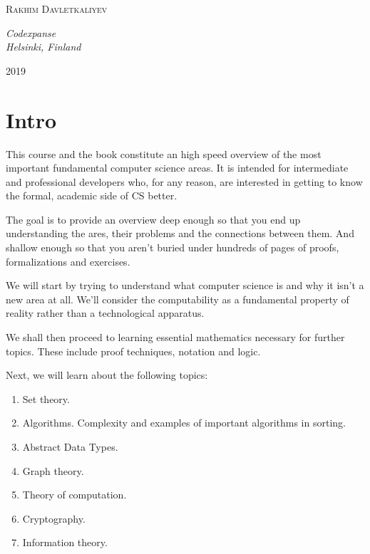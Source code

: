 \documentclass[a4paper, justified, notitlepage, sfsidenotes, notoc]{tufte-book}
\begin{document}
\begin{titlepage}
\begin{fullwidth}
	{\scshape\Large Rakhim Davletkaliyev \\} %

	\vspace{0.5\baselineskip} %

	\textit{Codexpanse\\ Helsinki, Finland} %

	\vfill %




	2019 %


\end{fullwidth}
\end{titlepage}
\setcounter{tocdepth}{4}
\tableofcontents

\part{Intro}
\label{sec:orgb00b7b6}

This course and the book constitute an high speed overview of the most important fundamental computer science areas. It is intended for intermediate and professional developers who, for any reason, are interested in getting to know the formal, academic side of CS better.

The goal is to provide an overview deep enough so that you end up understanding the ares, their problems and the connections between them. And shallow enough so that you aren't buried under hundreds of pages of proofs, formalizations and exercises.

We will start by trying to understand what computer science is and why it isn't a new area at all. We'll consider the computability as a fundamental property of reality rather than a technological apparatus.

We shall then proceed to learning essential mathematics necessary for further topics. These include proof techniques, notation and logic.

Next, we will learn about the following topics:

\begin{enumerate}
\item Set theory.
\item Algorithms. Complexity and examples of important algorithms in sorting.
\item Abstract Data Types.
\item Graph theory.
\item Theory of computation.
\item Cryptography.
\item Information theory.
\end{enumerate}
\end{document}
